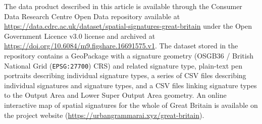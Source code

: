 
The data product described in this article is available through the Consumer Data
Research Centre Open Data repository available at
\hyperlink{https://data.cdrc.ac.uk/dataset/spatial-signatures-great-britain}{https://data.cdrc.ac.uk/dataset/spatial-signatures-great-britain}
under the Open Government Licence v3.0 license and archived at
\hyperlink{https://doi.org/10.6084/m9.figshare.16691575.v1}{https://doi.org/10.6084/m9.figshare.16691575.v1}.
The dataset stored in the repository contains a GeoPackage with a signature geometry
(OSGB36 / British National Grid (\texttt{EPSG:27700}) CRS) and related signature type,
plain-text pen portraits describing individual signature types, a series of CSV files
describing individual signatures and signature types, and a CSV files linking signature
types to the Output Area and Lower Super Output Area geometry. An online interactive map
of spatial signatures for the whole of Great Britain is available on the project website
(\hyperlink{https://urbangrammarai.xyz/great-britain}{https://urbangrammarai.xyz/great-britain}).